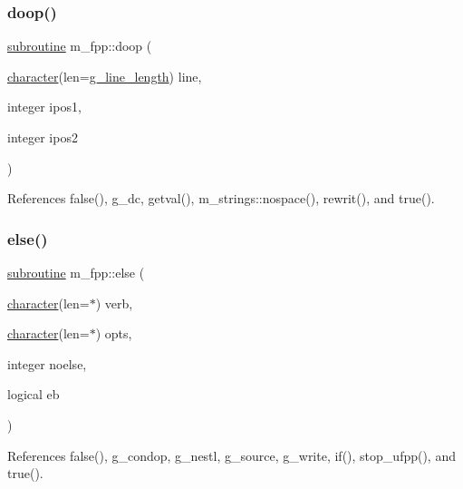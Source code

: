 \mbox{\label{namespacem__fpp_a56d098fa1c69f9afbfbf0aacceed9fff}} 
\subsubsection{\texorpdfstring{doop()}{doop()}}
{\footnotesize\ttfamily \hyperlink{M__stopwatch_83_8txt_acfbcff50169d691ff02d4a123ed70482}{subroutine} m\+\_\+fpp\+::doop (\begin{DoxyParamCaption}\item[{\hyperlink{option__stopwatch_83_8txt_abd4b21fbbd175834027b5224bfe97e66}{character}(len=\hyperlink{namespacem__fpp_ab93f8756cf248cf8db932573009d4664}{g\+\_\+line\+\_\+length})}]{line,  }\item[{integer}]{ipos1,  }\item[{integer}]{ipos2 }\end{DoxyParamCaption})}



References false(), g\+\_\+dc, getval(), m\+\_\+strings\+::nospace(), rewrit(), and true().

\mbox{\label{namespacem__fpp_aa7ce8afa566111e9b6f86922b9ec3205}} 
\subsubsection{\texorpdfstring{else()}{else()}}
{\footnotesize\ttfamily \hyperlink{M__stopwatch_83_8txt_acfbcff50169d691ff02d4a123ed70482}{subroutine} m\+\_\+fpp\+::else (\begin{DoxyParamCaption}\item[{\hyperlink{option__stopwatch_83_8txt_abd4b21fbbd175834027b5224bfe97e66}{character}(len=$\ast$)}]{verb,  }\item[{\hyperlink{option__stopwatch_83_8txt_abd4b21fbbd175834027b5224bfe97e66}{character}(len=$\ast$)}]{opts,  }\item[{integer}]{noelse,  }\item[{logical}]{eb }\end{DoxyParamCaption})}



References false(), g\+\_\+condop, g\+\_\+nestl, g\+\_\+source, g\+\_\+write, if(), stop\+\_\+ufpp(), and true().

